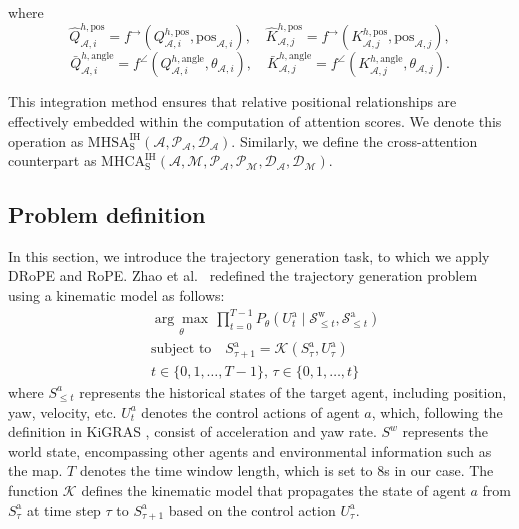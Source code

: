 \documentclass[lettersize,journal]{IEEEtran}
\theoremstyle{definition}
\begin{document}
where
\begin{equation}
\hat{Q}_{\mathcal{A},i}^{h,\text{pos}} = f^{\rightarrow}(Q_{\mathcal{A},i}^{h,\text{pos}}, \text{pos}_{\mathcal{A},i}), \quad 
\hat{K}_{\mathcal{A},j}^{h,\text{pos}} = f^{\rightarrow}(K_{\mathcal{A},j}^{h,\text{pos}}, \text{pos}_{\mathcal{A},j}),
\end{equation}
\begin{equation}
\bar{Q}_{\mathcal{A},i}^{h,\text{angle}} = f^\angle(Q_{\mathcal{A},i}^{h,\text{angle}}, \theta_{\mathcal{A},i}), \quad
\bar{K}_{\mathcal{A},j}^{h,\text{angle}} = f^\angle(K_{\mathcal{A},j}^{h,\text{angle}}, \theta_{\mathcal{A},j}).
\end{equation}

This integration method ensures that relative positional relationships are effectively embedded within the computation of attention scores. We denote this operation as \( \text{MHSA}_\text{S}^\text{IH}(\mathcal{A}, \mathcal{P}_\mathcal{A}, \mathcal{D}_\mathcal{A}) \). 
Similarly, we define the cross-attention counterpart as  
\( \text{MHCA}_\text{S}^\text{IH}(\mathcal{A}, \mathcal{M}, \mathcal{P}_\mathcal{A}, \mathcal{P}_\mathcal{M}, \mathcal{D}_\mathcal{A}, \mathcal{D}_\mathcal{M}) \).


\subsection{Problem definition}

In this section, we introduce the trajectory generation task, to which we apply DRoPE and RoPE. Zhao et al.~\cite{10803038} redefined the trajectory generation problem using a kinematic model as follows:
\begin{equation}
\begin{aligned}
\label{eq:task_reformal}
& \underset{\theta}{\arg \max }\, \prod_{t=0}^{T-1}P_{\theta}\left(U^\text{a}_t \mid \mathcal{S}^\text{w}_{\leq t}, \mathcal{S}^\text{a}_{\leq t}\right) \\
& \text{subject to} \quad S^\text{a}_{\tau +1} = \mathcal{K}(S_\tau^\text{a}, U_\tau^\text{a}) \\
& t \in \{0,1,\dots, T-1\},\, \tau\in \{0,1,\dots,t\}
\end{aligned}
\end{equation}
where \( S^a_{\leq t} \) represents the historical states of the target agent, including position, yaw, velocity, etc. \( U^a_t \) denotes the control actions of agent \( a \), which, following the definition in KiGRAS \cite{10803038}, consist of acceleration and yaw rate. \( S^w \) represents the world state, encompassing other agents and environmental information such as the map. \( T \) denotes the time window length, which is set to 8s in our case. The function \( \mathcal{K} \) defines the kinematic model that propagates the state of agent \( a \) from \( S_\tau^\text{a} \) at time step \( \tau \) to \( S^\text{a}_{\tau +1} \) based on the control action \( U_\tau^\text{a} \).
\end{document}
